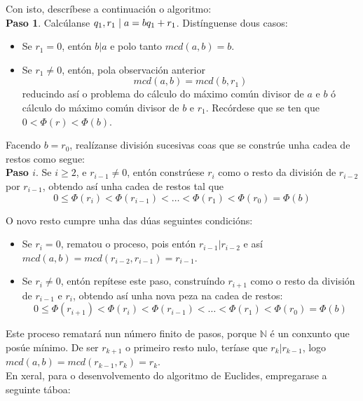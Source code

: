\documentclass[twoside]{report}
\theoremstyle{mystyle}
\begin{document}
\noindent Con isto, descríbese a continuación o algoritmo:\\

\noindent \textbf{Paso 1}. Calcúlanse $q_{1}, r_{1} \hspace{1mm} | \hspace{1mm} a = bq_{1} + r_{1}$. Distínguense dous casos:

\begin{itemize}
    \item  Se $r_{1} = 0$, entón $b|a$ e polo tanto $mcd(a,b) = b$.
    \item Se $r_{1} \neq 0$, entón, pola observación anterior
    $$mcd(a,b) = mcd(b, r_{1})$$
    reducindo así o problema do cálculo do máximo común divisor de $a$ e $b$ ó cálculo do máximo común divisor de $b$ e $r_{1}$. Recórdese que se ten que $0 < \Phi(r) < \Phi(b)$.
    
\end{itemize}

\noindent Facendo $b = r_{0}$, realízanse división sucesivas coas que se constrúe unha cadea de restos como segue:\\

\noindent \textbf{Paso $i$}. Se $i \geq 2$, e $r_{i-1} \neq 0$, entón constrúese $r_{i}$ como o resto da división de $r_{i-2}$ por $r_{i-1}$, obtendo así unha cadea de restos tal que
$$0 \leq \Phi(r_{i}) < \Phi(r_{i-1}) < \ldots < \Phi(r_{1}) < \Phi(r_{0}) = \Phi(b)$$

\noindent O novo resto cumpre unha das dúas seguintes condicións:

\begin{itemize}
    \item Se $r_{i} = 0$, rematou o proceso, pois entón $r_{i-1}|r_{i-2}$ e así $mcd(a,b) = mcd(r_{i-2}, r_{i-1}) = r_{i-1}$.
    \item Se $r_{i} \neq 0$, entón repítese este paso, construíndo $r_{i+1}$ como o resto da división de $r_{i-1}$ e $r_{i}$, obtendo así unha nova peza na cadea de restos:
    $$0 \leq \Phi(r_{i+1}) < \Phi(r_{i}) < \Phi(r_{i-1}) < \ldots < \Phi(r_{1}) < \Phi(r_{0}) = \Phi(b)$$
\end{itemize}

\noindent Este proceso rematará nun número finito de pasos, porque $\mathbb{N}$ é un conxunto que posúe mínimo. De ser $r_{k+1}$ o primeiro resto nulo, teríase que $r_{k}|r_{k-1}$, logo $mcd(a,b) = mcd(r_{k-1}, r_{k}) = r_{k}$.\\

\noindent En xeral, para o desenvolvemento do algoritmo de Euclides, empregarase a seguinte táboa:
\end{document}
